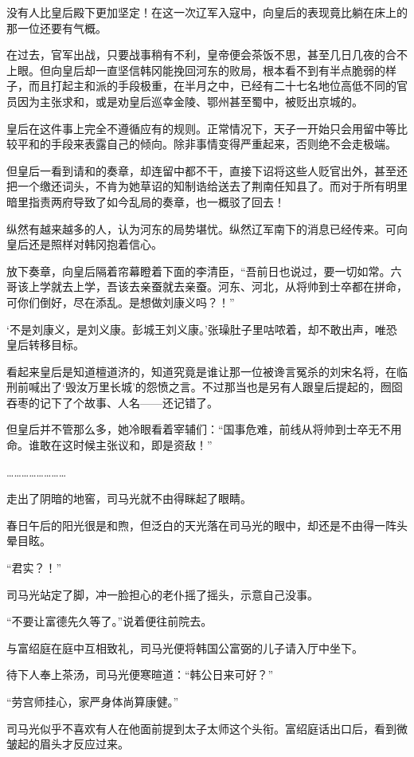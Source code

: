 没有人比皇后殿下更加坚定！在这一次辽军入寇中，向皇后的表现竟比躺在床上的那一位还要有气概。 

在过去，官军出战，只要战事稍有不利，皇帝便会茶饭不思，甚至几日几夜的合不上眼。但向皇后却一直坚信韩冈能挽回河东的败局，根本看不到有半点脆弱的样子，而且打起主和派的手段极重，在半月之中，已经有二十七名地位高低不同的官员因为主张求和，或是劝皇后巡幸金陵、鄂州甚至蜀中，被贬出京城的。 

皇后在这件事上完全不遵循应有的规则。正常情况下，天子一开始只会用留中等比较平和的手段来表露自己的倾向。除非事情变得严重起来，否则绝不会走极端。 

但皇后一看到请和的奏章，却连留中都不干，直接下诏将这些人贬官出外，甚至还把一个缴还词头，不肯为她草诏的知制诰给送去了荆南任知县了。而对于所有明里暗里指责两府导致了如今乱局的奏章，也一概驳了回去！ 

纵然有越来越多的人，认为河东的局势堪忧。纵然辽军南下的消息已经传来。可向皇后还是照样对韩冈抱着信心。 

放下奏章，向皇后隔着帘幕瞪着下面的李清臣，“吾前日也说过，要一切如常。六哥该上学就去上学，吾该去亲蚕就去亲蚕。河东、河北，从将帅到士卒都在拼命，可你们倒好，尽在添乱。是想做刘康义吗？！” 

‘不是刘康义，是刘义康。彭城王刘义康。’张璪肚子里咕哝着，却不敢出声，唯恐皇后转移目标。 

看起来皇后是知道檀道济的，知道究竟是谁让那一位被谗言冤杀的刘宋名将，在临刑前喊出了‘毁汝万里长城’的怨愤之言。不过那当也是另有人跟皇后提起的，囫囵吞枣的记下了个故事、人名——还记错了。 

但皇后并不管那么多，她冷眼看着宰辅们：“国事危难，前线从将帅到士卒无不用命。谁敢在这时候主张议和，即是资敌！” 

…………………… 

走出了阴暗的地窖，司马光就不由得眯起了眼睛。 

春日午后的阳光很是和煦，但泛白的天光落在司马光的眼中，却还是不由得一阵头晕目眩。

“君实？！” 

司马光站定了脚，冲一脸担心的老仆摇了摇头，示意自己没事。 

“不要让富德先久等了。”说着便往前院去。 

与富绍庭在庭中互相致礼，司马光便将韩国公富弼的儿子请入厅中坐下。 

待下人奉上茶汤，司马光便寒暄道：“韩公日来可好？” 

“劳宫师挂心，家严身体尚算康健。” 

司马光似乎不喜欢有人在他面前提到太子太师这个头衔。富绍庭话出口后，看到微皱起的眉头才反应过来。 

